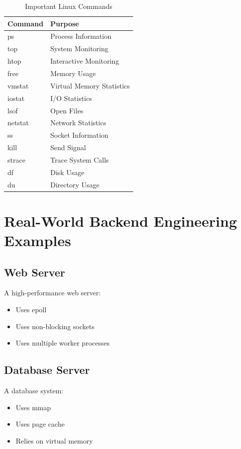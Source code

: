 \begin{table}[H]
\centering
\begin{tabular}{ll}
\toprule
Command & Purpose \\
\midrule
ps & Process Information \\
top & System Monitoring \\
htop & Interactive Monitoring \\
free & Memory Usage \\
vmstat & Virtual Memory Statistics \\
iostat & I/O Statistics \\
lsof & Open Files \\
netstat & Network Statistics \\
ss & Socket Information \\
kill & Send Signal \\
strace & Trace System Calls \\
df & Disk Usage \\
du & Directory Usage \\
\bottomrule
\end{tabular}
\caption{Important Linux Commands}
\end{table}

\section{Real-World Backend Engineering Examples}

\subsection{Web Server}

A high-performance web server:

\begin{itemize}
\item Uses epoll
\item Uses non-blocking sockets
\item Uses multiple worker processes
\end{itemize}

\subsection{Database Server}

A database system:

\begin{itemize}
\item Uses mmap
\item Uses page cache
\item Relies on virtual memory
\end{itemize}

